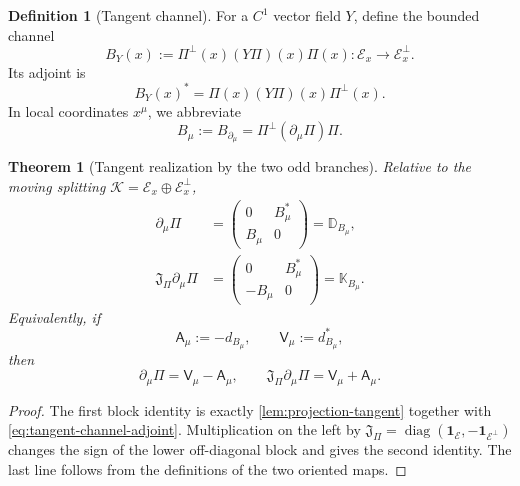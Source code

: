 \documentclass[11pt,reqno]{scrartcl}
\newcommand{\scrK}{\mathscr K}
\newcommand{\fundJ}{\mathfrak J}
\newcommand{\idop}{\mathbf 1}
\newcommand{\Aop}{\mathsf A}
\newcommand{\Vop}{\mathsf V}
\newcommand{\DB}{\mathbb D}
\newcommand{\KB}{\mathbb K}
\DeclareMathOperator{\diag}{diag}
\theoremstyle{plain}
\newtheorem{theorem}{Theorem}[section]
\theoremstyle{definition}
\newtheorem{definition}[definition]{Definition}
\theoremstyle{remark}
\begin{document}
\begin{definition}[Tangent channel]
\label{def:tangent-channel}
For a \(C^1\) vector field \(Y\), define the bounded channel
\begin{equation}
  B_Y(x):=\Pi^\perp(x)(Y\Pi)(x)\Pi(x)
  :\mathscr E_x\longrightarrow\mathscr E_x^\perp.
  \label{eq:tangent-channel}
\end{equation}
Its adjoint is
\begin{equation}
  B_Y(x)^*=\Pi(x)(Y\Pi)(x)\Pi^\perp(x).
  \label{eq:tangent-channel-adjoint}
\end{equation}
In local coordinates \(x^\mu\), we abbreviate
\begin{equation}
  B_\mu:=B_{\partial_\mu}
  =\Pi^\perp(\partial_\mu\Pi)\Pi.
  \label{eq:Bmu}
\end{equation}
\end{definition}

\begin{theorem}[Tangent realization by the two odd branches]
\label{thm:tangent-realization}
Relative to the moving splitting
\(\scrK=\mathscr E_x\oplus\mathscr E_x^\perp\),
\begin{align}
  \partial_\mu\Pi
  &=
  \begin{pmatrix}
    0&B_\mu^*\\
    B_\mu&0
  \end{pmatrix}
  =\DB_{B_\mu},
  \label{eq:dPi-D}\\
  \fundJ_\Pi\partial_\mu\Pi
  &=
  \begin{pmatrix}
    0&B_\mu^*\\
    -B_\mu&0
  \end{pmatrix}
  =\KB_{B_\mu}.
  \label{eq:JdPi-K}
\end{align}
Equivalently, if
\begin{equation}
  \Aop_\mu:=-d_{B_\mu},
  \qquad
  \Vop_\mu:=d_{B_\mu}^*,
  \label{eq:moving-AV}
\end{equation}
then
\begin{equation}
  \partial_\mu\Pi=\Vop_\mu-\Aop_\mu,
  \qquad
  \fundJ_\Pi\partial_\mu\Pi=\Vop_\mu+\Aop_\mu.
  \label{eq:moving-DK-AV}
\end{equation}
\end{theorem}

\begin{proof}
The first block identity is exactly \cref{lem:projection-tangent} together
with \eqref{eq:tangent-channel-adjoint}.  Multiplication on the left by
\(\fundJ_\Pi=\diag(\idop_{\mathscr E},-\idop_{\mathscr E^\perp})\) changes
the sign of the lower off-diagonal block and gives the second identity.  The
last line follows from the definitions of the two oriented maps.
\end{proof}
\end{document}
